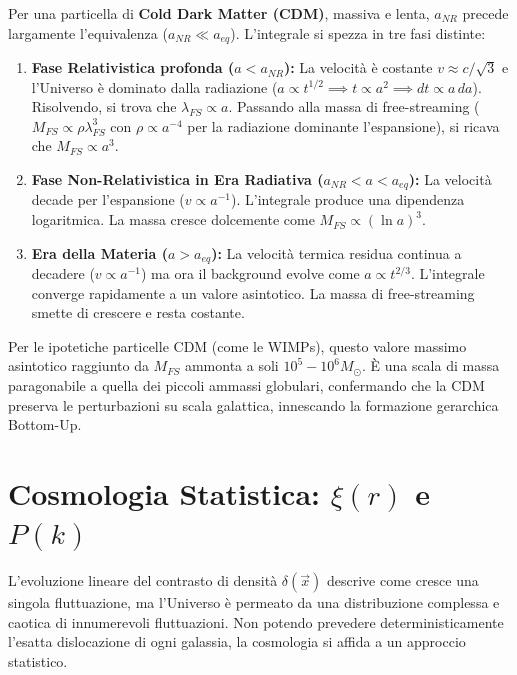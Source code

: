 \documentclass[11pt,a4paper]{report}
\begin{document}
Per una particella di \textbf{Cold Dark Matter (CDM)}, massiva e lenta, $a_{NR}$ precede largamente l'equivalenza ($a_{NR} \ll a_{eq}$). L'integrale si spezza in tre fasi distinte:
\begin{enumerate}
    \item \textbf{Fase Relativistica profonda ($a < a_{NR}$):} La velocità è costante $v \approx c/\sqrt{3}$ e l'Universo è dominato dalla radiazione ($a \propto t^{1/2} \implies t \propto a^2 \implies dt \propto a \, da$). Risolvendo, si trova che $\lambda_{FS} \propto a$. Passando alla massa di free-streaming ($M_{FS} \propto \rho \lambda_{FS}^3$ con $\rho \propto a^{-4}$ per la radiazione dominante l'espansione), si ricava che $M_{FS} \propto a^3$.
    \item \textbf{Fase Non-Relativistica in Era Radiativa ($a_{NR} < a < a_{eq}$):} La velocità decade per l'espansione ($v \propto a^{-1}$). L'integrale produce una dipendenza logaritmica. La massa cresce dolcemente come $M_{FS} \propto (\ln a)^3$.
    \item \textbf{Era della Materia ($a > a_{eq}$):} La velocità termica residua continua a decadere ($v \propto a^{-1}$) ma ora il background evolve come $a \propto t^{2/3}$. L'integrale converge rapidamente a un valore asintotico. La massa di free-streaming smette di crescere e resta costante.
\end{enumerate}
Per le ipotetiche particelle CDM (come le WIMPs), questo valore massimo asintotico raggiunto da $M_{FS}$ ammonta a soli $10^5 - 10^6 M_\odot$. È una scala di massa paragonabile a quella dei piccoli ammassi globulari, confermando che la CDM preserva le perturbazioni su scala galattica, innescando la formazione gerarchica Bottom-Up.

\section{Cosmologia Statistica: $\xi(r)$ e $P(k)$}

L'evoluzione lineare del contrasto di densità $\delta(\vec{x})$ descrive come cresce una singola fluttuazione, ma l'Universo è permeato da una distribuzione complessa e caotica di innumerevoli fluttuazioni. Non potendo prevedere deterministicamente l'esatta dislocazione di ogni galassia, la cosmologia si affida a un approccio statistico.
\end{document}
